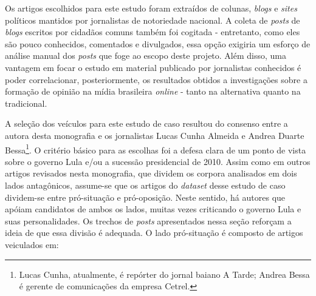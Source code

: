 Os artigos escolhidos para este estudo foram extraídos de colunas, \emph{blogs} e \emph{sites} políticos mantidos por jornalistas de notoriedade nacional. A coleta de \emph{posts} de \emph{blogs} escritos por cidadãos comuns também foi cogitada - entretanto, como eles são pouco conhecidos, comentados e divulgados, essa opção exigiria um esforço de análise manual dos \emph{posts} que foge ao escopo deste projeto. Além disso, uma vantagem em focar o estudo em material publicado por jornalistas conhecidos é poder correlacionar, posteriormente, os resultados obtidos a investigações sobre a formação de opinião na mídia brasileira \emph{online} - tanto na alternativa quanto na tradicional. 

A seleção dos veículos para este estudo de caso resultou do consenso entre a autora desta monografia e os jornalistas Lucas Cunha Almeida e Andrea Duarte Bessa\footnote{Lucas Cunha, atualmente, é repórter do jornal baiano A Tarde; Andrea Bessa é gerente de comunicações da empresa Cetrel.}. O critério básico para as escolhas foi a defesa clara de um ponto de vista sobre o governo Lula e/ou a sucessão presidencial de 2010. Assim como em outros artigos revisados nesta monografia, que dividem os corpora analisados em dois lados antagônicos, assume-se que os artigos do \emph{dataset} desse estudo de caso dividem-se entre pró-situação e pró-oposição. Neste sentido, há autores que apóiam candidatos de ambos os lados, muitas vezes criticando o governo Lula e suas personalidades. Os trechos de \emph{posts} apresentados nessa seção reforçam a ideia de que essa divisão é adequada. O lado pró-situação é composto de artigos veiculados em:


